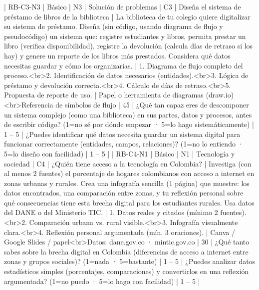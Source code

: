 | RB-C3-N3 | Básico | N3 | Solución de problemas | C3 | Diseña el sistema de préstamo de libros de la biblioteca | La biblioteca de tu colegio quiere digitalizar su sistema de préstamo. Diseña (sin código, usando diagrama de flujo y pseudocódigo) un sistema que: registre estudiantes y libros, permita prestar un libro (verifica disponibilidad), registre la devolución (calcula días de retraso si los hay) y genere un reporte de los libros más prestados. Considera qué datos necesitas guardar y cómo los organizarías. | 1. Diagrama de flujo completo del proceso.<br>2. Identificación de datos necesarios (entidades).<br>3. Lógica de préstamo y devolución correcta.<br>4. Cálculo de días de retraso.<br>5. Propuesta de reporte de uso. | Papel o herramienta de diagramas (draw.io)<br>Referencia de símbolos de flujo | 45 | ¿Qué tan capaz eres de descomponer un sistema complejo (como una biblioteca) en sus partes, datos y procesos, antes de escribir código? (1=no sé por dónde empezar · 5=lo hago sistemáticamente) | 1 – 5 | ¿Puedes identificar qué datos necesita guardar un sistema digital para funcionar correctamente (entidades, campos, relaciones)? (1=no lo entiendo · 5=lo diseño con facilidad) | 1 – 5 |
| RB-C4-N1 | Básico | N1 | Tecnología y sociedad | C4 | ¿Quién tiene acceso a la tecnología en Colombia? | Investiga (con al menos 2 fuentes) el porcentaje de hogares colombianos con acceso a internet en zonas urbanas y rurales. Crea una infografía sencilla (1 página) que muestre: los datos encontrados, una comparación entre zonas, y tu reflexión personal sobre qué consecuencias tiene esta brecha digital para los estudiantes rurales. Usa datos del DANE o del Ministerio TIC. | 1. Datos reales y citados (mínimo 2 fuentes).<br>2. Comparación urbana vs. rural visible.<br>3. Infografía visualmente clara.<br>4. Reflexión personal argumentada (mín. 3 oraciones). | Canva / Google Slides / papel<br>Datos: dane.gov.co · mintic.gov.co | 30 | ¿Qué tanto sabes sobre la brecha digital en Colombia (diferencias de acceso a internet entre zonas y grupos sociales)? (1=nada · 5=bastante) | 1 – 5 | ¿Puedes analizar datos estadísticos simples (porcentajes, comparaciones) y convertirlos en una reflexión argumentada? (1=no puedo · 5=lo hago con facilidad) | 1 – 5 |

